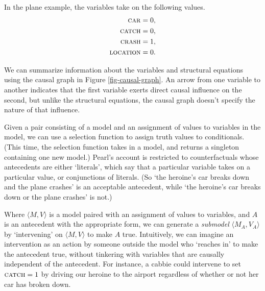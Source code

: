 In the plane example, the variables take on the following values.
$$
\begin{aligned}
  \text{\textsc{car}} &= 0,\\
  \text{\textsc{catch}} &= 0,\\
  \text{\textsc{crash}} &= 1,\\
  \text{\textsc{location}} &= 0.
\end{aligned}
$$

We can summarize information about the variables and structural equations using the causal graph in Figure \ref{fig-causal-graph}. An arrow from one variable to another indicates that the first variable exerts direct causal influence on the second, but unlike the structural equations, the causal graph doesn't specify the nature of that influence.

Given a pair consisting of a model and an assignment of values to variables in the model, we can use a selection function to assign truth values to conditionals.  (This time, the selection function takes in a model, and returns a singleton containing one new model.)  Pearl's account is restricted to counterfactuals whose antecedents are either `literals', which say that a particular variable takes on a particular value, or conjunctions of literals.  (So `the heroine's car breaks down and the plane crashes' is an acceptable antecedent, while `the heroine's car breaks down or the plane crashes' is not.)

Where $\langle M, V\rangle$ is a model paired with an assignment of values to variables, and $A$ is an antecedent with the appropriate form, we can generate a \emph{submodel} $\langle M_A, V_A\rangle$ by `intervening' on $\langle M, V\rangle$ to make $A$ true.  Intuitively, we can imagine an intervention as an action by someone outside the model who `reaches in' to make the antecedent true, without tinkering with variables that are causally independent of the antecedent.  For instance, a cabbie could intervene to set $\text{\textsc{catch}} = 1$ by driving our heroine to the airport regardless of whether or not her car has broken down.

